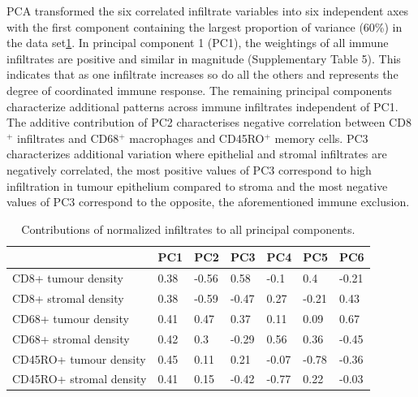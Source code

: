  
 
 PCA transformed the six correlated infiltrate variables into six independent axes with the first component containing the largest proportion of variance (60\%) in the data set\ref{tab:PC}. In principal component 1 (PC1), the weightings of all immune infiltrates are positive and similar in magnitude (Supplementary Table 5). This indicates that as one infiltrate increases so do all the others and represents the degree of coordinated immune response. The remaining principal components characterize additional patterns across immune infiltrates independent of PC1. The additive contribution of PC2 characterises negative correlation between CD8$^+$ infiltrates and CD68$^+$ macrophages and CD45RO$^+$ memory cells. PC3 characterizes additional variation where epithelial and stromal infiltrates are negatively correlated, the most positive values of PC3 correspond to high infiltration in tumour epithelium compared to stroma and the most negative values of PC3 correspond to the opposite, the aforementioned immune exclusion. 
 
\begin{table}[]
    \centering
    \begin{tabular}{lllllll}
&PC1& PC2&PC3&PC4&PC5&PC6\\
\hline
CD8+ tumour density& 0.38&-0.56&0.58&-0.1&0.4&-0.21\\
CD8+ stromal density&0.38&-0.59&-0.47&0.27&-0.21&0.43\\
CD68+ tumour density&0.41&0.47&0.37&0.11&0.09&0.67\\
CD68+ stromal density&0.42&0.3&-0.29&0.56&0.36&-0.45\\
CD45RO+ tumour density&0.45&0.11&0.21&-0.07&-0.78&-0.36\\
CD45RO+ stromal density&0.41&0.15&-0.42&-0.77&0.22&-0.03\\
\hline
    \end{tabular}
    \caption{Contributions of normalized infiltrates to all principal components.}
    \label{tab:PC}
\end{table}


 
 
